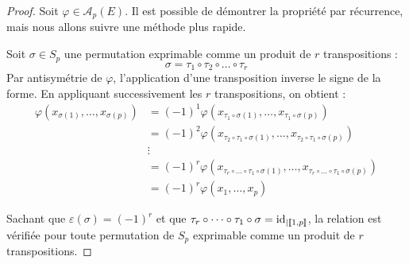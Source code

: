 \documentclass[12pt, a4paper]{report}
\begin{document}
\begin{proof}
    Soit $\varphi \in \mathscr A_p(E)$. Il est possible de démontrer la propriété par récurrence, mais nous allons suivre une méthode plus rapide.

    Soit $\sigma \in S_p$ une permutation exprimable comme un produit de $r$ transpositions :
    $$\sigma = \tau_1 \circ \tau_2 \circ \dots \circ \tau_r$$
    Par antisymétrie de $\varphi$, l'application d'une transposition inverse le signe de la forme. En appliquant successivement les $r$ transpositions, on obtient :
    \begin{align*}
        \varphi(x_{\sigma(1)}, \dots, x_{\sigma(p)}) &= (-1)^1 \varphi(x_{\tau_1\circ\sigma(1)}, \dots, x_{\tau_1\circ\sigma(p)}) \\
        &= (-1)^2 \varphi(x_{\tau_2\circ\tau_1\circ\sigma(1)}, \dots, x_{\tau_2\circ\tau_1\circ\sigma(p)}) \\
        &\vdots \\
        &= (-1)^r \varphi(x_{\tau_r\circ\dots\circ\tau_1\circ\sigma(1)}, \dots, x_{\tau_r\circ\dots\circ\tau_1\circ\sigma(p)}) \\
        &= (-1)^r \varphi(x_1, \dots, x_p)
    \end{align*}

    Sachant que $\varepsilon(\sigma) = (-1)^r$ et que $\tau_r \circ \dots \circ \tau_1 \circ \sigma = \mathrm{id}_{|[\![1,p]\!]}$, la relation est vérifiée pour toute permutation de $S_p$ exprimable comme un produit de $r$ transpositions.

        
        

\end{proof}
\end{document}
